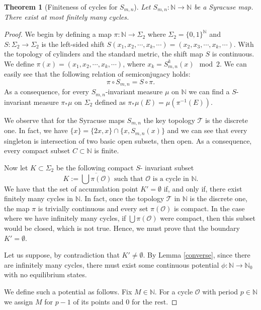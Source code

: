 \documentclass[10pt,a4paper]{amsart}
\newtheorem{theorem}{Theorem}
\begin{document}
\begin{theorem}[Finiteness of cycles for $S_{m,n}$] \label{finite_Syracuse}
	Let $S_{m,n} : \mathbb{N} \to \mathbb{N}$ be a Syracuse map. There exist at most finitely many cycles.
\end{theorem}

\begin{proof}
	We begin by defining a map $\pi : \mathbb{N} \to \Sigma_{2}$ where $\Sigma_{2} = \{0,1\}^{\mathbb{N}}$ and $S : \Sigma_{2} \to \Sigma_{2}$ is the left-sided shift $S(x_{1}, x_{2}, \cdots, x_{k},\cdots) =  (x_{2}, x_{3}, \cdots, x_{k},\cdots)$. With the topology of cylinders and the standard metric, the shift map $S$ is continuous. We define $\pi(x) = (x_{1}, x_{2}, \cdots, x_{k},\cdots)$, where $x_{k} = S_{m,n}^{k}(x) \mod 2$. We can easily see that the following relation of semiconjugacy holds:
	\[
	\pi \circ S_{m,n} = S \circ \pi.
	\]
	As a consequence, for every $S_{m,n}$-invariant measure $\mu$ on $\mathbb{N}$ we can find a $S$-invariant measure $\pi_{*}\mu$ on $\Sigma_{2}$ defined as $\pi_{*}\mu(E) = \mu(\pi^{-1}(E))$.
	
	We observe that for the Syracuse maps $S_{m,n}$ the key topology $\mathcal{T}$ is the discrete one. In fact, we have $\{x\} = \{2x, x\} \cap \{x, S_{m,n}(x)\}$ and we can see that every singleton is intersection of two basic open subsets, then open. As a consequence, every compact subset $C \subset \mathbb{N}$ is finite.
	
	Now let $K \subset \Sigma_{2}$ be the following compact $S$- invariant subset
	\[
	K := \overline{\bigcup \pi(\mathcal{O})} \,\, \text{such that} \,\, \mathcal{O} \,\, \text{is a cycle in} \,\, \mathbb{N}. 
	\]
	We have that the set of accumulation point $K' = \emptyset$ if, and only if, there exist finitely many cycles in $\mathbb{N}$. In fact, once the topology $\mathcal{T}$ in $\mathbb{N}$ is the discrete one, the map $\pi$ is trivially continuous and every set $\pi(\mathcal{O})$ is compact. In the case where we have infinitely many cycles, if $\bigcup \pi(\mathcal{O})$ were compact, then this subset would be closed, which is not true. Hence, we must prove that the boundary $K' = \emptyset$.
	
	Let us suppose, by contradiction that $K' \neq \emptyset$. By Lemma \ref{converse}, since there are infinitely many cycles, there must exist some continuous potential $\phi : \mathbb{N} \to \mathbb{N}_{0}$ with no equilibrium states. 
	
	We define such a potential as follows. Fix $M \in \mathbb{N}$. For a cycle $\mathcal{O}$ with period $p \in \mathbb{N}$ we assign $M$ for $p - 1$ of its points and $0$ for the rest. 
	

\end{proof}
\end{document}
